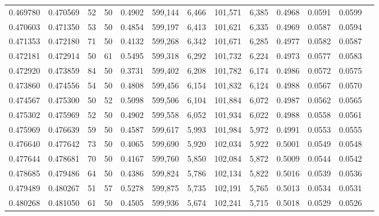 \begin{tabular}{rrrrrrrrrrrrr}
0.469780 & 0.470569 &    52 &  50 &                                     0.4902 & 599,144 &   6,466 & 101,571 &   6,385 & 0.4968 & 0.0591 & 0.0599 \\
0.470603 & 0.471350 &    53 &  50 &                                     0.4854 & 599,197 &   6,413 & 101,621 &   6,335 & 0.4969 & 0.0587 & 0.0594 \\
0.471353 & 0.472180 &    71 &  50 &                                     0.4132 & 599,268 &   6,342 & 101,671 &   6,285 & 0.4977 & 0.0582 & 0.0587 \\
0.472181 & 0.472914 &    50 &  61 &                                     0.5495 & 599,318 &   6,292 & 101,732 &   6,224 & 0.4973 & 0.0577 & 0.0583 \\
0.472920 & 0.473859 &    84 &  50 &                                     0.3731 & 599,402 &   6,208 & 101,782 &   6,174 & 0.4986 & 0.0572 & 0.0575 \\
0.473860 & 0.474556 &    54 &  50 &                                     0.4808 & 599,456 &   6,154 & 101,832 &   6,124 & 0.4988 & 0.0567 & 0.0570 \\
0.474567 & 0.475300 &    50 &  52 &                                     0.5098 & 599,506 &   6,104 & 101,884 &   6,072 & 0.4987 & 0.0562 & 0.0565 \\
0.475302 & 0.475969 &    52 &  50 &                                     0.4902 & 599,558 &   6,052 & 101,934 &   6,022 & 0.4988 & 0.0558 & 0.0561 \\
0.475969 & 0.476639 &    59 &  50 &                                     0.4587 & 599,617 &   5,993 & 101,984 &   5,972 & 0.4991 & 0.0553 & 0.0555 \\
0.476640 & 0.477642 &    73 &  50 &                                     0.4065 & 599,690 &   5,920 & 102,034 &   5,922 & 0.5001 & 0.0549 & 0.0548 \\
0.477644 & 0.478681 &    70 &  50 &                                     0.4167 & 599,760 &   5,850 & 102,084 &   5,872 & 0.5009 & 0.0544 & 0.0542 \\
0.478685 & 0.479486 &    64 &  50 &                                     0.4386 & 599,824 &   5,786 & 102,134 &   5,822 & 0.5016 & 0.0539 & 0.0536 \\
0.479489 & 0.480267 &    51 &  57 &                                     0.5278 & 599,875 &   5,735 & 102,191 &   5,765 & 0.5013 & 0.0534 & 0.0531 \\
0.480268 & 0.481050 &    61 &  50 &                                     0.4505 & 599,936 &   5,674 & 102,241 &   5,715 & 0.5018 & 0.0529 & 0.0526 \\

\end{tabular}
